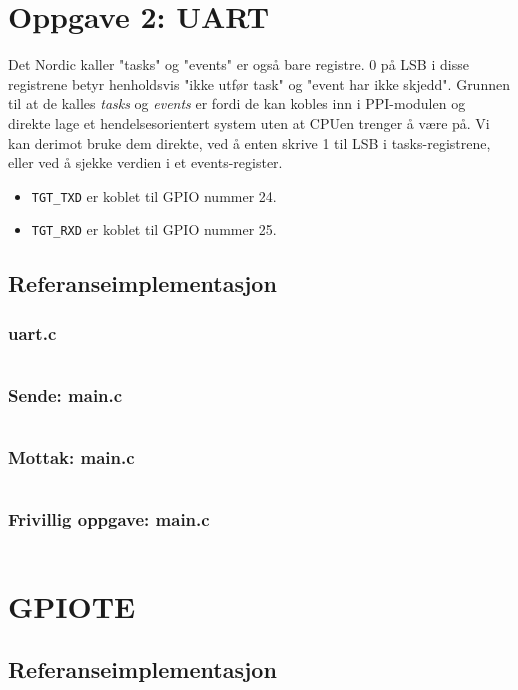 \documentclass[11pt,a4paper]{article}
\begin{document}
\section{Oppgave 2: UART}
Det Nordic kaller "tasks" og "events" er også bare registre. 0 på LSB i disse registrene betyr henholdsvis "ikke utfør task" og "event har ikke skjedd". Grunnen til at de kalles \textit{tasks} og \textit{events} er fordi de kan kobles inn i PPI-modulen og direkte lage et hendelsesorientert system uten at CPUen trenger å være på. Vi kan derimot bruke dem direkte, ved å enten skrive 1 til LSB i tasks-registrene, eller ved å sjekke verdien i et events-register.
\begin{itemize}
\item \texttt{TGT_TXD} er koblet til GPIO nummer 24.
\item \texttt{TGT_RXD} er koblet til GPIO nummer 25.
\end{itemize}

\subsection{Referanseimplementasjon}
\subsubsection{uart.c}
\inputminted{c}{../build/uart/uart.c}

\subsubsection{Sende: main.c}
\inputminted{c}{../build/uart/main_tx.c}

\subsubsection{Mottak: main.c}
\inputminted{c}{../build/uart/main_rx.c}

\subsubsection{Frivillig oppgave: main.c}
\inputminted{c}{../build/uart/main_voluntary.c}

\section{GPIOTE}
\subsection{Referanseimplementasjon}
\inputminted{c}{../build/gpiote/}
\end{document}
